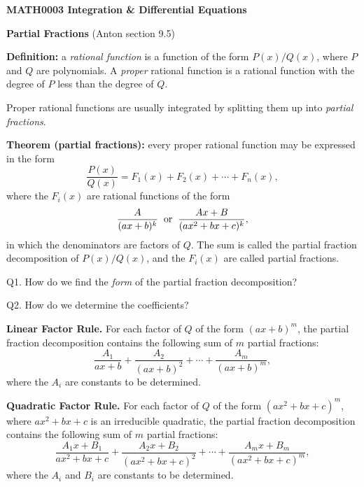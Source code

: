 \documentclass[11pt]{article}
\begin{document}
\begin{center}

\large{\bf MATH0003 Integration \& Differential Equations}
\normalsize

\bigskip

{\bf Partial Fractions} (Anton section 9.5)

\end{center}

\medskip
\noindent
{\bf Definition:} a {\em rational function} 
is a function of the form $P(x)/Q(x)$, 
where $P$ and $Q$ are polynomials.  
A {\em proper} rational function is a rational function 
with the degree of $P$ less than the degree of $Q$.  

\medskip
\noindent
Proper rational functions are usually integrated 
by splitting them up into {\em partial fractions}.  

\medskip
\noindent
{\bf Theorem (partial fractions):} every proper rational function 
may be expressed in the form
\[
\frac{P(x)}{Q(x)} = F_1(x) + F_2(x) + \cdots + F_n(x),
\]
where the $F_i(x)$ are rational functions of the form 
\[
\frac{A}{(ax+b)^k} \;\; {\rm or} \;\; \frac{Ax+B}{(ax^2+bx+c)^k}, 
\]
in which the denominators are factors of $Q$.  
The sum is called the partial fraction decomposition of $P(x)/Q(x)$, 
and the $F_i(x)$ are called partial fractions.  

\medskip
\noindent
Q1. How do we find the {\em form} of the partial fraction decomposition?  

\noindent
Q2. How do we determine the coefficients?  

\medskip
\noindent
{\bf Linear Factor Rule.}  
For each factor of $Q$ of the form $(ax+b)^m$, 
the partial fraction decomposition contains 
the following sum of $m$ partial fractions:  
\[
\frac{A_1}{ax+b} + \frac{A_2}{(ax+b)^2} + \cdots + \frac{A_m}{(ax+b)^m},
\]
where the $A_i$ are constants to be determined.  

\medskip
\noindent
{\bf Quadratic Factor Rule.}  
For each factor of $Q$ of the form $(ax^2+bx+c)^m$, 
where $ax^2+bx+c$ is an irreducible quadratic, 
the partial fraction decomposition contains 
the following sum of $m$ partial fractions:  
\[
\frac{A_1x+B_1}{ax^2+bx+c} + \frac{A_2x+B_2}{(ax^2+bx+c)^2} + \cdots 
  + \frac{A_mx+B_m}{(ax^2+bx+c)^m},
\]
where the $A_i$ and $B_i$ are constants to be determined.  
 
\end{document}
